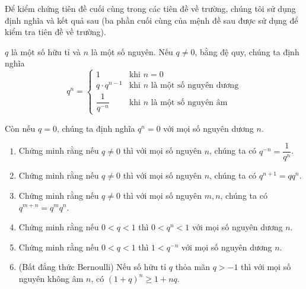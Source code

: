 Để kiểm chứng tiên đề cuối cùng trong các tiên đề về trường, chúng tôi sử dụng định nghĩa và kết quả sau (ba phần cuối cùng của mệnh đề sau được sử dụng để kiểm tra tiên đề về trường).
\begin{proposition}
    $q$ là một số hữu tỉ và $n$ là một số nguyên. Nếu $q\ne 0$, bằng đệ quy, chúng ta định nghĩa
    \[
        q^{n} = \begin{cases}
            1                 & \text{khi $n = 0$}                    \\
            q\cdot q^{n-1}    & \text{khi $n$ là một số nguyên dương} \\
            \dfrac{1}{q^{-n}} & \text{khi $n$ là một số nguyên âm}
        \end{cases}
    \]

    Còn nếu $q = 0$, chúng ta định nghĩa $q^{n} = 0$ với mọi số nguyên dương $n$.

    \begin{enumerate}[label={(\roman*)}]
        \item Chứng minh rằng nếu $q\ne 0$ thì với mọi số nguyên $n$, chúng ta có $q^{-n} = \dfrac{1}{q^{n}}$.
        \item Chứng minh rằng nếu $q\ne 0$ thì với mọi số nguyên $n$, chúng ta có $q^{n+1} = qq^{n}$.
        \item Chứng minh rằng nếu $q\ne 0$ thì với mọi số nguyên $m, n$, chúng ta có $q^{m + n} = q^{m}q^{n}$.
        \item Chứng minh rằng nếu $0 < q < 1$ thì $0 < q^{n} < 1$ với mọi số nguyên dương $n$.
        \item Chứng minh rằng nếu $0 < q < 1$ thì $1 < q^{-n}$ với mọi số nguyên dương $n$.
        \item (Bất đẳng thức Bernoulli) Nếu số hữu tỉ $q$ thỏa mãn $q > -1$ thì với mọi số nguyên không âm $n$, có ${(1 + q)}^{n}\geq 1 + nq$.
    \end{enumerate}
\end{proposition}

